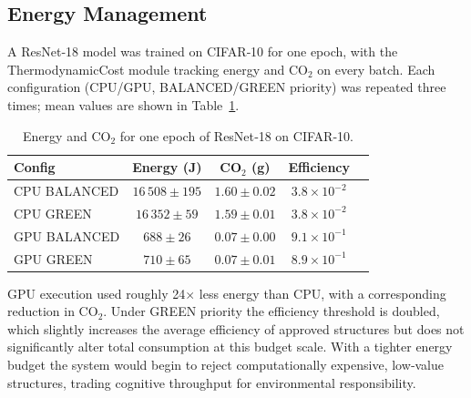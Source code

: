 \subsection{Energy Management}

A ResNet‑18 model was trained on CIFAR‑10 for one epoch, with the
ThermodynamicCost module tracking energy and CO$_2$ on every batch.
Each configuration (CPU/GPU, BALANCED/GREEN priority) was repeated three
times; mean values are shown in Table~\ref{tab:energy}.

\begin{table}[htbp]
\centering
\caption{Energy and CO$_2$ for one epoch of ResNet‑18 on CIFAR‑10.}
\label{tab:energy}
\begin{tabular}{l c c c c}
\toprule
\textbf{Config} & \textbf{Energy (J)} & \textbf{CO$_2$ (g)} & \textbf{Efficiency} \\
\midrule
CPU BALANCED & $16\,508 \pm 195$ & $1.60 \pm 0.02$ & $3.8\times10^{-2}$ \\
CPU GREEN    & $16\,352 \pm 59$  & $1.59 \pm 0.01$ & $3.8\times10^{-2}$ \\
GPU BALANCED & $  688 \pm 26$   & $0.07 \pm 0.00$ & $9.1\times10^{-1}$ \\
GPU GREEN    & $  710 \pm 65$   & $0.07 \pm 0.01$ & $8.9\times10^{-1}$ \\
\bottomrule
\end{tabular}
\end{table}

GPU execution used roughly 24$\times$ less energy than CPU, with a
corresponding reduction in CO$_2$.  Under GREEN priority the efficiency
threshold is doubled, which slightly increases the average efficiency of
approved structures but does not significantly alter total consumption at
this budget scale.  With a tighter energy budget the system would begin to
reject computationally expensive, low‑value structures, trading cognitive
throughput for environmental responsibility.